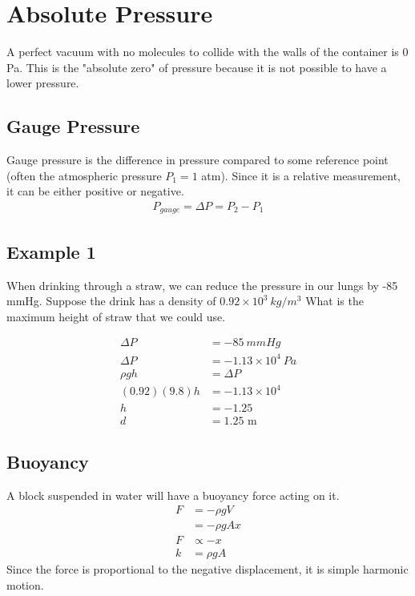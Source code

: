\documentclass{article}
\theoremstyle{mytheoremstyle}
\theoremstyle{mytheoremstyle}
\theoremstyle{myproblemstyle}
\begin{document}
    \section*{Absolute Pressure}
    A perfect vacuum with no molecules to collide with the walls of the
    container is 0 Pa. This is the "absolute zero" of pressure because it is not
    possible to have a lower pressure.

    \subsection*{Gauge Pressure}
    Gauge pressure is the difference in pressure compared to some reference
    point (often the atmospheric pressure $P_1 = 1$ atm). Since it is a relative
    measurement, it can be either positive or negative.
    \begin{align*}
        P_{gauge} = \Delta P = P_2 - P_1
    \end{align*}

    \subsection*{Example 1}
    When drinking through a straw, we can reduce the pressure in our lungs by
    -85 mmHg. Suppose the drink has a density of $0.92\times 10^3\ kg/m^3$ What
    is the maximum height of straw that we could use.

    \begin{align*}
        \Delta P &= -85\ mmHg \\
        \Delta P &= -1.13\times 10^4\ Pa \\
        \rho gh &= \Delta P \\
        (0.92) (9.8)h &= -1.13\times 10^4 \\
        h &= -1.25 \\
        d &= 1.25\text{ m}
    \end{align*}

    \subsection*{Buoyancy}
    A block suspended in water will have a buoyancy force acting on it.
    \begin{align*}
        F &= -\rho g V \\
          &= -\rho g A x \\
        F &\propto -x \\
        k &= \rho g A
    \end{align*}
    Since the force is proportional to the negative displacement, it is simple
    harmonic motion.
\end{document}
